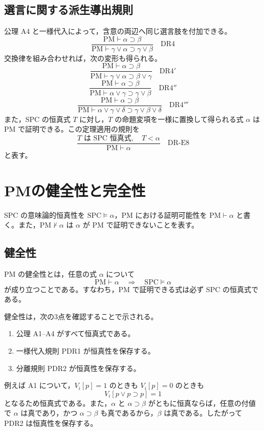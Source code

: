 \documentclass[../main.tex]{subfiles}
\begin{document}
\subsection{選言に関する派生導出規則}

公理 A4 と一様代入によって，含意の両辺へ同じ選言肢を付加できる。
\[
  \frac{\mathrm{PM}\vdash\alpha\supset\beta}
       {\mathrm{PM}\vdash\gamma\lor\alpha\supset\gamma\lor\beta}
  \quad\mathrm{DR4}
\]
交換律を組み合わせれば，次の変形も得られる。
\[
  \frac{\mathrm{PM}\vdash\alpha\supset\beta}
       {\mathrm{PM}\vdash\gamma\lor\alpha\supset\beta\lor\gamma}
  \quad\mathrm{DR4'}
\]
\[
  \frac{\mathrm{PM}\vdash\alpha\supset\beta}
       {\mathrm{PM}\vdash\alpha\lor\gamma\supset\gamma\lor\beta}
  \quad\mathrm{DR4''}
\]
\[
  \frac{\mathrm{PM}\vdash\alpha\supset\beta}
       {\mathrm{PM}\vdash\alpha\lor\gamma\lor\delta
        \supset\gamma\lor\beta\lor\delta}
  \quad\mathrm{DR4'''}
\]
また，SPC の恒真式 \(T\) に対し，\(T\) の命題変項を一様に置換して得られる式 \(\alpha\) は PM で証明できる。この定理適用の規則を
\[
  \frac{T\text{ は SPC 恒真式},\quad T<\alpha}
       {\mathrm{PM}\vdash\alpha}
  \quad\mathrm{DR\text{-}E8}
\]
と表す。

\section{PMの健全性と完全性}

SPC の意味論的恒真性を \(\mathrm{SPC}\vDash\alpha\)，PM における証明可能性を \(\mathrm{PM}\vdash\alpha\) と書く。また，\(\mathrm{PM}\nvdash\alpha\) は \(\alpha\) が PM で証明できないことを表す。

\subsection{健全性}

PM の健全性とは，任意の式 \(\alpha\) について
\[
  \mathrm{PM}\vdash\alpha
  \quad\Longrightarrow\quad
  \mathrm{SPC}\vDash\alpha
\]
が成り立つことである。すなわち，PM で証明できる式は必ず SPC の恒真式である。

健全性は，次の3点を確認することで示される。
\begin{enumerate}
  \item 公理 A1--A4 がすべて恒真式である。
  \item 一様代入規則 PDR1 が恒真性を保存する。
  \item 分離規則 PDR2 が恒真性を保存する。
\end{enumerate}
例えば A1 について，\(V_i[p]=1\) のときも \(V_i[p]=0\) のときも
\[
  V_i[p\lor p\supset p]=1
\]
となるため恒真式である。また，\(\alpha\) と \(\alpha\supset\beta\) がともに恒真ならば，任意の付値で \(\alpha\) は真であり，かつ \(\alpha\supset\beta\) も真であるから，\(\beta\) は真である。したがって PDR2 は恒真性を保存する。
\end{document}
